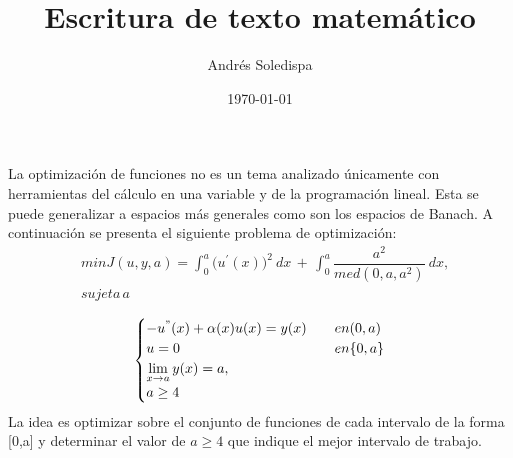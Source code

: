 \documentclass[a4paper,12pt]{article}
\author{Andrés Soledispa}
\title{Escritura de texto matemático}
\date{\today}
\begin{document}
\maketitle
La optimización de funciones no es un tema analizado únicamente con herramientas del cálculo en
una variable y de la programación lineal. Esta se puede generalizar a espacios más generales como
son los espacios de Banach. A continuación se presenta el siguiente problema de optimización:
\begin{align}
  &min J(u,y,a)=\int_{0}^{a} \big(u^{'}(x)\big)^{2}\ dx \,+\,\int_{0}  ^{a} \dfrac{a^2}{med(0,a,a^2)} \ dx , \\
\nonumber&sujeta \,a\nonumber 
\end{align}

\begin{align}
 \begin{cases}
-u^{"}(x)+\alpha(x)u(x)=y(x)\quad &en (0,a)\\
u=0 \quad &en \{0,a\}\\
\displaystyle \lim_{x \to a} y(x)=a,\\
a\geq 4
\end{cases}
\end{align}
La idea es optimizar sobre el conjunto de funciones de cada intervalo de la forma [0,a] y determinar
el valor de 
\(
a\geq4 
\)
que indique el mejor intervalo de trabajo.
\end{document}
